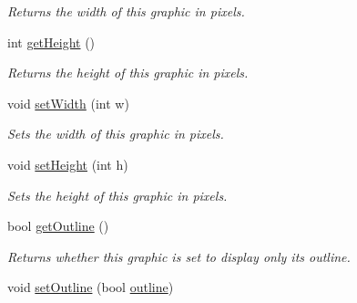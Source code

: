 \begin{DoxyCompactItemize}
\begin{DoxyCompactList}\small\item\em Returns the width of this graphic in pixels. \end{DoxyCompactList}\item 
\hypertarget{class_picto_1_1_diamond_graphic_a5b029038c5b2e72e86889e4798d4ae3d}{int \hyperlink{class_picto_1_1_diamond_graphic_a5b029038c5b2e72e86889e4798d4ae3d}{get\-Height} ()}\label{class_picto_1_1_diamond_graphic_a5b029038c5b2e72e86889e4798d4ae3d}

\begin{DoxyCompactList}\small\item\em Returns the height of this graphic in pixels. \end{DoxyCompactList}\item 
\hypertarget{class_picto_1_1_diamond_graphic_a04519f460ed65d6240c2e3463f8cc911}{void \hyperlink{class_picto_1_1_diamond_graphic_a04519f460ed65d6240c2e3463f8cc911}{set\-Width} (int w)}\label{class_picto_1_1_diamond_graphic_a04519f460ed65d6240c2e3463f8cc911}

\begin{DoxyCompactList}\small\item\em Sets the width of this graphic in pixels. \end{DoxyCompactList}\item 
\hypertarget{class_picto_1_1_diamond_graphic_a5a07b1497883a0bda48e0fe0100fbcf6}{void \hyperlink{class_picto_1_1_diamond_graphic_a5a07b1497883a0bda48e0fe0100fbcf6}{set\-Height} (int h)}\label{class_picto_1_1_diamond_graphic_a5a07b1497883a0bda48e0fe0100fbcf6}

\begin{DoxyCompactList}\small\item\em Sets the height of this graphic in pixels. \end{DoxyCompactList}\item 
\hypertarget{class_picto_1_1_diamond_graphic_a80e18d2c9525a9f91b1dec2ce3462e2a}{bool \hyperlink{class_picto_1_1_diamond_graphic_a80e18d2c9525a9f91b1dec2ce3462e2a}{get\-Outline} ()}\label{class_picto_1_1_diamond_graphic_a80e18d2c9525a9f91b1dec2ce3462e2a}

\begin{DoxyCompactList}\small\item\em Returns whether this graphic is set to display only its outline. \end{DoxyCompactList}\item 
\hypertarget{class_picto_1_1_diamond_graphic_a8a4da18b5b58af9ac9b3765e5943089f}{void \hyperlink{class_picto_1_1_diamond_graphic_a8a4da18b5b58af9ac9b3765e5943089f}{set\-Outline} (bool \hyperlink{class_picto_1_1_diamond_graphic_a2bb741d32e008c05a0210f0494c8a357}{outline})}\label{class_picto_1_1_diamond_graphic_a8a4da18b5b58af9ac9b3765e5943089f}


\end{DoxyCompactItemize}
